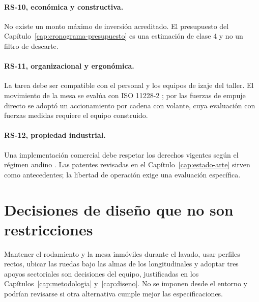 \paragraph{RS-10, económica y constructiva.} No existe un monto máximo de inversión acreditado. El presupuesto del Capítulo~\ref{cap:cronograma-presupuesto} es una estimación de clase 4 y no un filtro de descarte.

\paragraph{RS-11, organizacional y ergonómica.} La tarea debe ser compatible con el personal y los equipos de izaje del taller. El movimiento de la mesa se evalúa con ISO 11228-2 \cite{iso11228}; por las fuerzas de empuje directo se adoptó un accionamiento por cadena con volante, cuya evaluación con fuerzas medidas requiere el equipo construido.

\paragraph{RS-12, propiedad industrial.} Una implementación comercial debe respetar los derechos vigentes según el régimen andino \cite{can486}. Las patentes revisadas en el Capítulo~\ref{cap:estado-arte} sirven como antecedentes; la libertad de operación exige una evaluación específica.

\section*{Decisiones de diseño que no son restricciones}

Mantener el rodamiento y la mesa inmóviles durante el lavado, usar perfiles rectos, ubicar las ruedas bajo las almas de los longitudinales y adoptar tres apoyos sectoriales son decisiones del equipo, justificadas en los Capítulos~\ref{cap:metodologia} y~\ref{cap:diseno}. No se imponen desde el entorno y podrían revisarse si otra alternativa cumple mejor las especificaciones.
